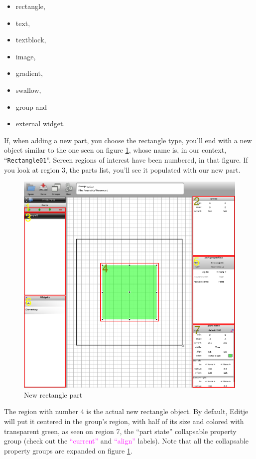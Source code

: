 \documentclass[a4paper]{profusion}
\newcommand{\GUILabel}[1]{\textcolor{magenta}{#1}}
\begin{document}
\begin{itemize}
  \item rectangle,
  \item text,
  \item textblock,
  \item image,
  \item gradient,
  \item swallow,
  \item group and
  \item external widget.
\end{itemize}

If, when adding a new part, you choose the rectangle type, you'll end
with a new object similar to the one seen on figure
\ref{fig:new_rectangle}, whose name is, in our context,
``\texttt{Rectangle01}''. Screen regions of interest have been
numbered, in that figure. If you look at region 3, the parts list,
you'll see it populated with our new part.

\begin{figure}[h!]
  \centering
  \includegraphics[width=1.0\textwidth]{images/new_rectangle_numbers.png}
  \caption{New rectangle part}
  \label{fig:new_rectangle}
\end{figure}

The region with number 4 is the actual new rectangle object. By
default, Editje will put it centered in the group's region, with half
of its size and colored with transparent green, as seen on region 7,
the ``part state'' collapsable property group (check out the
\GUILabel{``current''} and \GUILabel{``align''} labels). Note that all
the collapsable property groups are expanded on figure
\ref{fig:new_rectangle}.
\end{document}
